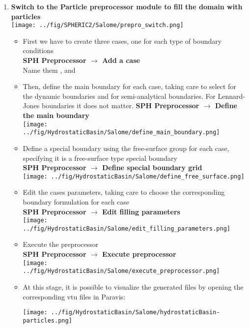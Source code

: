 \documentclass{../GPUSPHtemplate}
\begin{document}
\begin{enumerate}
\begin{itemize}
  \end{itemize}
\item \textbf{Switch to the Particle preprocessor module to fill the domain with particles}\smallskip\\
  \texttt{[image: ../fig/SPHERIC2/Salome/prepro\_switch.png]}
  \begin{itemize}
  \item First we have to create three cases, one for each type of boundary conditions\\
    \textbf{SPH Preprocessor $\to$ Add a case}\\
    Name them ,  and     
  \item Then, define the main boundary for each case, taking care to select 
    for the dynamic boundaries and  for semi-analytical boundaries. For
    Lennard-Jones boundaries it does not matter.
    \textbf{SPH Preprocessor $\to$ Define the main boundary}\\
    \texttt{[image: ../fig/HydrostaticBasin/Salome/define\_main\_boundary.png]}
  \item Define a special boundary using the free-surface group for each case, specifying it is a free-surface type special
    boundary\\
    \textbf{SPH Preprocessor $\to$ Define special boundary grid}\\
    \texttt{[image: ../fig/HydrostaticBasin/Salome/define\_free\_surface.png]}
  \item Edit the cases parameters, taking care to choose the corresponding boundary formulation for each case\\
    \textbf{SPH Preprocessor $\to$ Edit filling parameters}\\
    \texttt{[image: ../fig/HydrostaticBasin/Salome/edit\_filling\_parameters.png]}
  \item Execute the preprocessor\\
    \textbf{SPH Preprocessor $\to$ Execute preprocessor}\\
    \texttt{[image: ../fig/HydrostaticBasin/Salome/execute\_preprocessor.png]}
  \item At this stage, it is possible to visualize the generated files by opening the corresponding vtu files in Paravis:\\
    \begin{center}\texttt{[image: ../fig/HydrostaticBasin/Salome/hydrostaticBasin-particles.png]}\end{center}
    

\end{itemize}
\end{enumerate}
\end{document}
